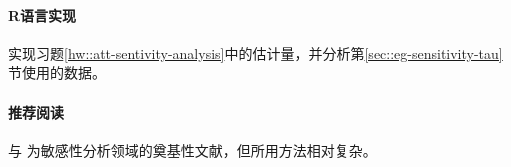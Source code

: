 \paragraph{R语言实现}

实现习题\ref{hw::att-sentivity-analysis}中的估计量，并分析第\ref{sec::eg-sensitivity-tau}节使用的数据。 


\paragraph{推荐阅读}

 \citet{Rosenbaum::1983JRSSB} 与 \citet{imbens2003sensitivity} 为敏感性分析领域的奠基性文献，但所用方法相对复杂。


